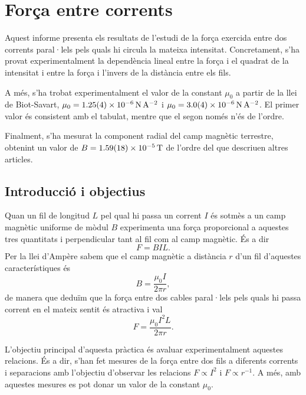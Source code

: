 \chapter{Força entre corrents}
\begin{resum}
	Aquest informe presenta els resultats de l'estudi de la força exercida entre dos corrents paral·lels pels quals hi circula la mateixa intensitat. Concretament, s'ha provat experimentalment la dependència lineal entre la força i el quadrat de la intensitat i entre la força i l'invers de la distància entre els fils.

	A més, s'ha trobat experimentalment el valor de la constant \( \mu_0 \) a partir de la llei de Biot-Savart, \( \mu_0 = \data{1.25}{0.04e-6}{N.A^{-2}} \) i \( \mu_0 = \data{3.0}{0.4d-6}{N.A^{-2}} \). El primer valor és consistent amb el tabulat, mentre que el segon només n'és de l'ordre. 

	Finalment, s'ha mesurat la component radial del camp magnètic terrestre, obtenint un valor de \( B = \data{1.59}{0.18d-5}{T} \) de l'ordre del que descriuen altres articles.
\end{resum}

\section{Introducció i objectius}
Quan un fil de longitud \( L \) pel qual hi passa un corrent \( I \) és sotmès a un camp magnètic uniforme de mòdul \( B \) experimenta una força proporcional a aquestes tres quantitats i perpendicular tant al fil com al camp magnètic. És a dir
\begin{equation} \label{eq:forca magnetica} 
	F = BIL.
\end{equation}
Per la llei d'Ampère sabem que el camp magnètic a distància \( r \) d'un fil d'aquestes característiques és 
\begin{equation*}
	B = \frac{\mu_0 I}{2\pi r},
\end{equation*}
de manera que deduïm que la força entre dos cables paral·lels pels quals hi passa corrent en el mateix sentit és atractiva i val
\begin{equation} \label{eq:forca i corrent}
	F = \frac{\mu_0I^2L}{2\pi r}.
\end{equation}

L'objectiu principal d'aquesta pràctica és avaluar experimentalment aquestes relacions. És a dir, s'han fet mesures de la força entre dos fils a diferents corrents i separacions amb l'objectiu d'observar les relacions \( F \propto I^2 \) i \( F \propto r^{-1} \). A més, amb aquestes mesures es pot donar un valor de la constant \( \mu_0 \).  

